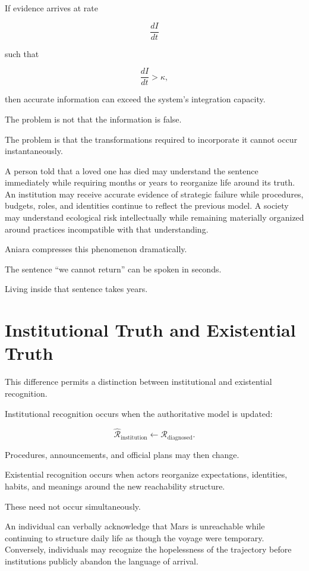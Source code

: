 \documentclass[11pt,oneside]{book}
\theoremstyle{definition}
\theoremstyle{remark}
\newcommand{\R}{\mathcal{R}}
\begin{document}
If evidence arrives at rate

\[
\frac{dI}{dt}
\]

such that

\[
\frac{dI}{dt}>\kappa,
\]

then accurate information can exceed the system's integration capacity.

The problem is not that the information is false.

The problem is that the transformations required to incorporate it cannot occur instantaneously.

A person told that a loved one has died may understand the sentence immediately while requiring months or years to reorganize life around its truth. An institution may receive accurate evidence of strategic failure while procedures, budgets, roles, and identities continue to reflect the previous model. A society may understand ecological risk intellectually while remaining materially organized around practices incompatible with that understanding.

Aniara compresses this phenomenon dramatically.

The sentence ``we cannot return'' can be spoken in seconds.

Living inside that sentence takes years.

\section{Institutional Truth and Existential Truth}

This difference permits a distinction between institutional and existential recognition.

Institutional recognition occurs when the authoritative model is updated:

\[
\widehat{\R}_{\mathrm{institution}}
\leftarrow
\R_{\mathrm{diagnosed}}.
\]

Procedures, announcements, and official plans may then change.

Existential recognition occurs when actors reorganize expectations, identities, habits, and meanings around the new reachability structure.

These need not occur simultaneously.

An individual can verbally acknowledge that Mars is unreachable while continuing to structure daily life as though the voyage were temporary. Conversely, individuals may recognize the hopelessness of the trajectory before institutions publicly abandon the language of arrival.
\end{document}
